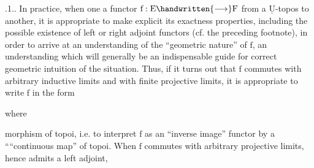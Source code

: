 .1.. In practice, when one  a functor $\mathrm{f}:\mathrm{E}\handwritten{\longrightarrow}\mathrm{F}$ from a $\underline{\mathrm{U}}$-topos to another, it is appropriate to make explicit  its exactness properties,  including the possible existence of left or right adjoint functors (cf. the preceding footnote), in order to arrive at an understanding of the ``geometric nature'' of $\mathrm{f}$,  an understanding which will generally be an indispensable guide for  correct geometric intuition of the situation. Thus, if it turns out that $\mathrm{f}$ commutes with arbitrary inductive limits and with finite projective limits, it is appropriate to write $\mathrm{f}$ in the form
where
morphism of topoi, i.e. to interpret $\mathrm{f}$ as an ``inverse image'' functor by a ````continuous map'' of topoi. When $\mathrm{f}$ commutes with arbitrary projective limits, hence admits a left adjoint,
